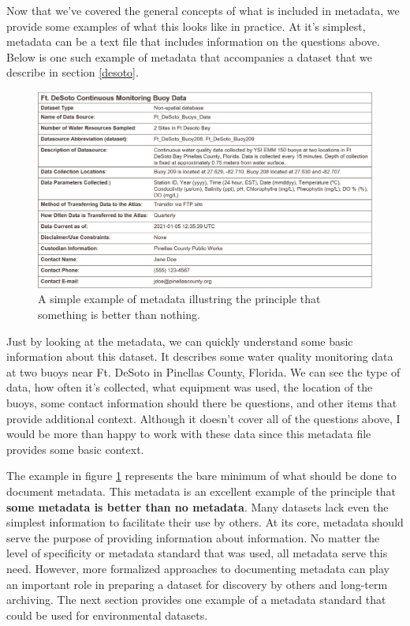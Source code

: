 \documentclass[
]{book}
\begin{document}
Now that we've covered the general concepts of what is included in metadata, we provide some examples of what this looks like in practice. At it's simplest, metadata can be a text file that includes information on the questions above. Below is one such example of metadata that accompanies a dataset that we describe in section \ref{desoto}.

\begin{figure}

{\centering \includegraphics[width=1\linewidth]{img/desotometa} 

}

\caption{A simple example of metadata illustring the principle that something is better than nothing.}\label{fig:desotometa}
\end{figure}

Just by looking at the metadata, we can quickly understand some basic information about this dataset. It describes some water quality monitoring data at two buoys near Ft. DeSoto in Pinellas County, Florida. We can see the type of data, how often it's collected, what equipment was used, the location of the buoys, some contact information should there be questions, and other items that provide additional context. Although it doesn't cover all of the questions above, I would be more than happy to work with these data since this metadata file provides some basic context.

The example in figure \ref{fig:desotometa} represents the bare minimum of what should be done to document metadata. This metadata is an excellent example of the principle that \textbf{some metadata is better than no metadata}. Many datasets lack even the simplest information to facilitate their use by others. At its core, metadata should serve the purpose of providing information about information. No matter the level of specificity or metadata standard that was used, all metadata serve this need. However, more formalized approaches to documenting metadata can play an important role in preparing a dataset for discovery by others and long-term archiving. The next section provides one example of a metadata standard that could be used for environmental datasets.
\end{document}
